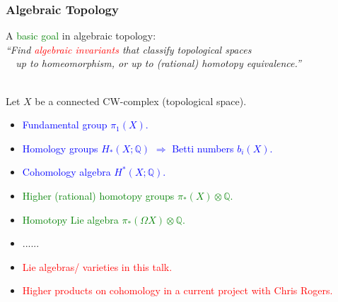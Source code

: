 \documentclass[dvipsnames]{beamer}
\theoremstyle{example}
\newcommand{\Q}{\mathbb{Q}}
\begin{document}
\begin{frame}  \small
\frametitle{Algebraic Topology}
 
A  \textcolor{Green}{basic goal} in algebraic topology: \\  
{\qquad \em ``Find \textcolor{Red}{algebraic invariants} that classify topological spaces\\
\qquad \ \  up to homeomorphism, or up to (rational) homotopy equivalence.''}\\ \

\pause

Let $X$ be a connected CW-complex (topological space). 

 

\begin{itemize}
\item  \textcolor{Blue}{Fundamental group $\pi_1(X)$.}
\item  \textcolor{Blue}{Homology groups $H_*(X;\Q)$  $\Longrightarrow$
  Betti numbers $b_i(X)$.}
\item  \textcolor{Blue}{Cohomology algebra $H^*(X;\Q)$. }
\pause
\item \textcolor{Green}{Higher (rational) homotopy groups $\pi_*(X)\otimes \Q$.}
\item \textcolor{Green}{Homotopy Lie algebra $\pi_*(\Omega X)\otimes \Q$.}
\item ...... 
\pause
\item  \textcolor{Red}{Lie algebras/ varieties in this talk.}
\item  \textcolor{Red}{Higher products on cohomology in a current project with Chris Rogers. }
\end{itemize}

\end{frame}


\end{document}
